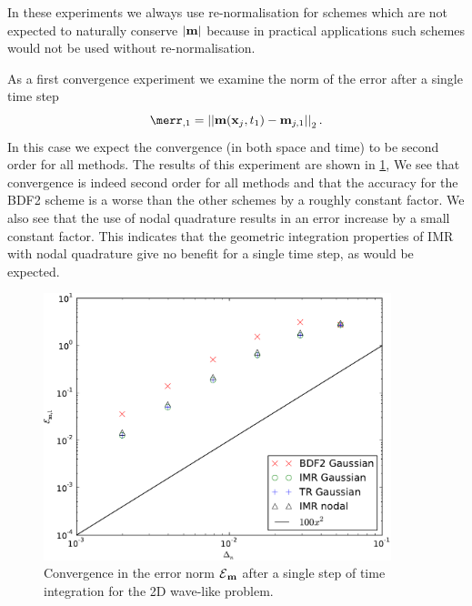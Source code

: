 In these experiments we always use re-normalisation for schemes which are not expected to naturally conserve $\left|{\boldsymbol{\mathrm{m}}} \right|$ because in practical applications such schemes would not be used without re-normalisation.

As a first convergence experiment we examine the norm of the error after a single time step
\begin{equation}
  \merr_{,1} = \norm{\mv(\xv_j, t_1) - \mv_{j,1}}_2.
\end{equation}
In this case we expect the convergence (in both space and time) to be second order for all methods.
The results of this experiment are shown in \cref{fig:convergence-one-step},
We see that convergence is indeed second order for all methods and that the accuracy for the BDF2 scheme is a worse than the other schemes by a roughly constant factor.
We also see that the use of nodal quadrature results in an error increase by a small constant factor.
This indicates that the geometric integration properties of IMR with nodal quadrature give no benefit for a single time step, as would be expected.
\begin{figure}
  \centering
  \includegraphics[width=0.9\textwidth]{plots/2d_wave_solution_convergence_long_time/firstoferrornormsvsfakemeanofdts.pdf}
  \caption{Convergence in the error norm $\mathcal{E}{}_{\boldsymbol{\mathrm{m}}}{}$ after a single step of time integration for the 2D wave-like problem.}
  \label{fig:convergence-one-step}
\end{figure}



